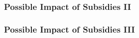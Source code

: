 \begin{frame}
  \frametitle{Possible Impact of Subsidies II}
\begin{center}
\begin{figure}[h!]
\centering
{} %
\label{fig:plot1}
\end{figure}
\end{center}
\end{frame}
\begin{frame}
  \frametitle{Possible Impact of Subsidies III}
\begin{center}
\begin{figure}[h!]
\centering
{} %
\label{fig:plot1}
\end{figure}
\end{center}
\end{frame}


